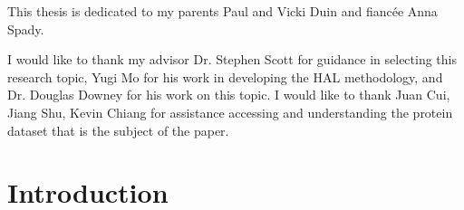 \documentclass[ms]{nuthesis}
\begin{document}

\begin{dedication}
  This thesis is dedicated to my parents Paul and Vicki Duin and fianc\'{e}e Anna Spady.
\end{dedication}

\begin{acknowledgments}
  I would like to thank my advisor Dr. Stephen Scott for guidance in selecting this
  research topic, Yugi Mo for his work in developing the HAL methodology, and Dr.
  Douglas Downey for his work on this topic. I would like to thank Juan Cui, Jiang Shu,
  Kevin Chiang for assistance accessing and understanding the protein dataset that is
  the subject of the paper.
\end{acknowledgments}


\tableofcontents

\mainmatter

\chapter{Introduction}
\end{document}
